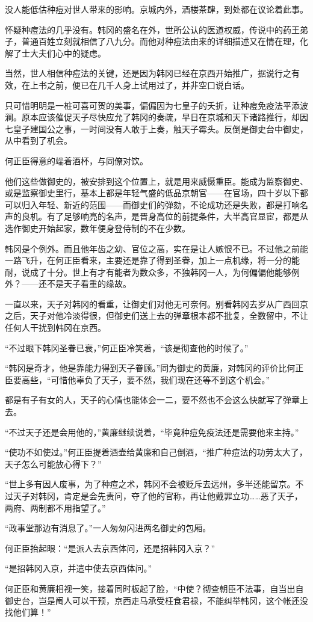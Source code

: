 没人能低估种痘对世人带来的影响。京城内外，酒楼茶肆，到处都在议论着此事。

怀疑种痘法的几乎没有。韩冈的盛名在外，世所公认的医道权威，传说中的药王弟子，普通百姓立刻就相信了八九分。而他对种痘法由来的详细描述又在情在理，化解了士大夫们心中的疑虑。

当然，世人相信种痘法的关键，还是因为韩冈已经在京西开始推广，据说行之有效，在上书之前，便已在几千人身上试用过了，并非空口说白话。

只可惜明明是一桩可喜可贺的美事，偏偏因为七皇子的夭折，让种痘免疫法平添波澜。原本应该催促天子尽快应允了韩冈的奏疏，早日在京城和天下诸路推行，却因七皇子建国公之事，一时间没有人敢于上奏，触天子霉头。反倒是御史台中御史，从中看到了机会。

何正臣得意的端着酒杯，与同僚对饮。

他们这些做御史的，被安排到这个位置上，就是用来威慑重臣。能成为监察御史、或是监察御史里行，基本上都是年轻气盛的低品京朝官——在官场，四十岁以下都可以归入年轻、新近的范围——而御史们的弹劾，不论成功还是失败，都是打响名声的良机。有了足够响亮的名声，是晋身高位的前提条件，大半高官显宦，都是从选作御史开始起家，数年便身登侍制的不在少数。

韩冈是个例外。而且他年齿之幼、官位之高，实在是让人嫉恨不已。不过他之前能一路飞升，在何正臣看来，主要还是靠了得到圣眷，加上一点机缘，将一分的能耐，说成了十分。世上有才有能者为数众多，不独韩冈一人，为何偏偏他能够例外？——还不是天子看重的缘故。

一直以来，天子对韩冈的看重，让御史们对他无可奈何。别看韩冈去岁从广西回京之后，天子对他冷淡得很，但御史们送上去的弹章根本都不批复，全数留中，不让任何人干扰到韩冈在京西。

“不过眼下韩冈圣眷已衰，”何正臣冷笑着，“该是彻查他的时候了。”

“韩冈是奇才，他是靠能力得到天子眷顾。”同为御史的黄廉，对韩冈的评价比何正臣要高些，“可惜他辜负了天子，要不然，我们现在还等不到这个机会。”

都是有子有女的人，天子的心情也能体会一二，要不然也不会这么快就写了弹章上去。

“不过天子还是会用他的，”黄廉继续说着，“毕竟种痘免疫法还是需要他来主持。”

“使功不如使过。”何正臣提着酒壶给黄廉和自己倒酒，“推广种痘法的功劳太大了，天子怎么可能放心得下？”

“世上多有因人废事，为了种痘之术，韩冈不会被贬斥去远州，多半还能留京。不过天子对韩冈，肯定是会先责问，夺了他的官称，再让他戴罪立功……恶了天子，两府、两制都不用指望了。”

“政事堂那边有消息了。”一人匆匆闪进两名御史的包厢。

何正臣抬起眼：“是派人去京西体问，还是招韩冈入京？”

“是招韩冈入京，并遣中使去京西体问。”

何正臣和黄廉相视一笑，接着同时板起了脸，“中使？彻查朝臣不法事，自当出自御史台，岂是阉人可以干预，京西走马承受枉食君禄，不能纠举韩冈，这个帐还没找他们算！”

